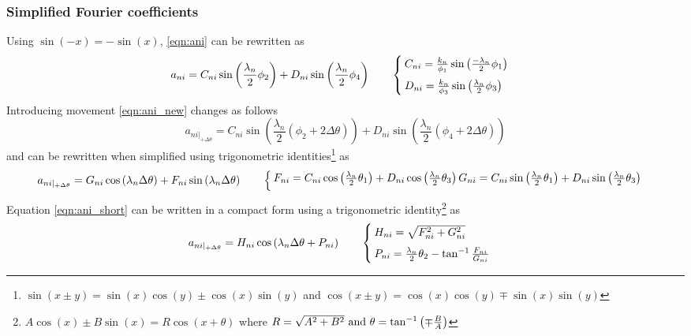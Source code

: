 \subsubsection{Simplified Fourier coefficients}
Using $\sin(-x)=-\sin(x)$, \eqref{eqn:ani} can be rewritten as 
\begin{equation}\label{eqn:ani_new}
    a_{ni}= C_{ni}\sin\left(\frac{\lambda_{n}}{2}\phi_{2}\right)+
    D_{ni}\sin\left(\frac{\lambda_{n}}{2}\phi_{4}\right)
    \qquad
    \begin{cases}
        \vspace{0.5em}
        C_{ni}=\frac{k_{n}}{\phi_{1}}\sin\left(\frac{-\lambda_{n}}{2} \phi_{1}\right) \\
        D_{ni}=\frac{k_{n}}{\phi_{3}}\sin\left(\frac{\lambda_{n}}{2} \phi_{3}\right)  \\
    \end{cases}                    
\end{equation}
Introducing movement \eqref{eqn:ani_new} changes as follows
\begin{equation}\label{eqn:ani_move}
    a_{ni|_{+\Delta\theta}}=
    C_{ni}\sin\left(
    \frac{\lambda_{n}}{2}\left(\phi_{2}+2\Delta\theta\right)\right)+
    D_{ni}\sin\left(
    \frac{\lambda_{n}}{2}\left(\phi_{4}+2\Delta\theta\right)\right)
\end{equation}
and can be rewritten when simplified using trigonometric identities\footnote
{
    $\sin(x\pm y)=\sin(x)\cos(y)\pm \cos(x)\sin(y)$ and
    $\cos(x\pm y)=\cos(x)\cos(y)\mp \sin(x)\sin(y)$
} 
as
\begin{equation}\label{eqn:ani_short}
    a_{ni|_{+\Delta\theta}}=G_{ni}\cos\left(\lambda_{n}\Delta\theta\right)+
        F_{ni}\sin\left(\lambda_{n}\Delta\theta\right)
    \qquad
    \begin{cases}
        \vspace{0.5em}
        F_{ni}=C_{ni}\cos\left(\frac{\lambda_{n}}{2}\theta_{1}\right)+
            D_{ni}\cos\left(\frac{\lambda_{n}}{2}\theta_{3}\right)
        G_{ni}=C_{ni}\sin\left(\frac{\lambda_{n}}{2}\theta_{1}\right)+
            D_{ni}\sin\left(\frac{\lambda_{n}}{2}\theta_{3}\right)
    \end{cases}
\end{equation}
Equation \eqref{eqn:ani_short} can be written in a compact form using a trigonometric identity\footnote
{
    $A\cos(x)\pm B\sin(x)=R\cos\left(x+\theta\right)$ where
    $R=\sqrt{A^{2}+B^{2}}\) and \(\theta=\tan^{-1}\left(\mp \frac{B}{A}\right)$
}
as
\begin{equation}\label{eqn:ani_save}
    a_{ni|_{+\Delta\theta}}=H_{ni}\cos
    \left(\lambda_{n}\Delta\theta+P_{ni}\right)
    \qquad
    \begin{cases}
        \vspace{0.5em}
        H_{ni}=\sqrt{F^{2}_{ni}+G^{2}_{ni}} \\
        P_{ni} = \frac{\lambda_{n}}{2}\theta_{2}-\tan^{-1}\frac{F_{ni}}{G_{ni}}
    \end{cases}
\end{equation} 

